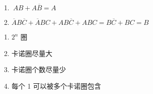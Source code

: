 \begin{enumerate}
          \begin{enumerate}
              \item $~AB+A\overline{B}=A$
              \item $\overline{A}B\overline{C}+\overline{A}BC+AB\overline{C}+ABC=B\overline{C}+BC=B$
          \end{enumerate}

          \begin{enumerate}
              \item $2^n$ 圈
              \item 卡诺圈尽量大
              \item 卡诺圈个数尽量少
              \item 每个 1 可以被多个卡诺圈包含
          \end{enumerate}

\end{enumerate}

\newpage
